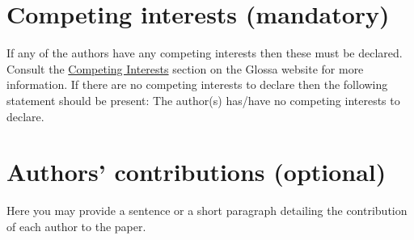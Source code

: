 \documentclass[charis,linguex]{glossa}
\begin{document}
\section*{Competing interests (mandatory)}

If any of the authors have any competing interests then these must be declared. Consult the \href{http://www.glossa-journal.org/about/competinginterests/}{Competing Interests} section on the Glossa website for more information. If there are no competing interests to declare then the following statement should be present: The author(s) has/have no competing interests to declare.

\section*{Authors' contributions (optional)}

Here you may provide a sentence or a short paragraph detailing the contribution of each author to the paper.

\nocite{*} %

\end{document}
